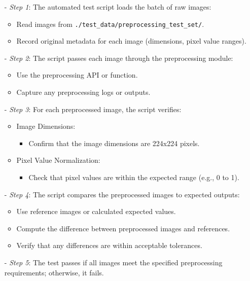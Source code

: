 \documentclass[12pt, titlepage]{article}
\begin{document}
\begin{enumerate}
\begin{itemize}
  \item[-] \textit{Step 1}: The automated test script loads the batch of raw images:
    \begin{itemize}
      \item Read images from \texttt{./test\_data/preprocessing\_test\_set/}.
      \item Record original metadata for each image (dimensions, pixel value ranges).
    \end{itemize}
  \item[-] \textit{Step 2}: The script passes each image through the preprocessing module:
    \begin{itemize}
      \item Use the preprocessing API or function.
      \item Capture any preprocessing logs or outputs.
    \end{itemize}
  \item[-] \textit{Step 3}: For each preprocessed image, the script verifies:
    \begin{itemize}
      \item Image Dimensions:
        \begin{itemize}
          \item Confirm that the image dimensions are 224x224 pixels.
        \end{itemize}
      \item Pixel Value Normalization:
        \begin{itemize}
          \item Check that pixel values are within the expected range (e.g., 0 to 1).
        \end{itemize}
    \end{itemize}
  \item[-] \textit{Step 4}: The script compares the preprocessed images to expected outputs:
    \begin{itemize}
      \item Use reference images or calculated expected values.
      \item Compute the difference between preprocessed images and references.
      \item Verify that any differences are within acceptable tolerances.
    \end{itemize}
  \item[-] \textit{Step 5}: The test passes if all images meet the specified preprocessing requirements; otherwise, it fails.
\end{itemize}


\end{enumerate}
\end{document}
